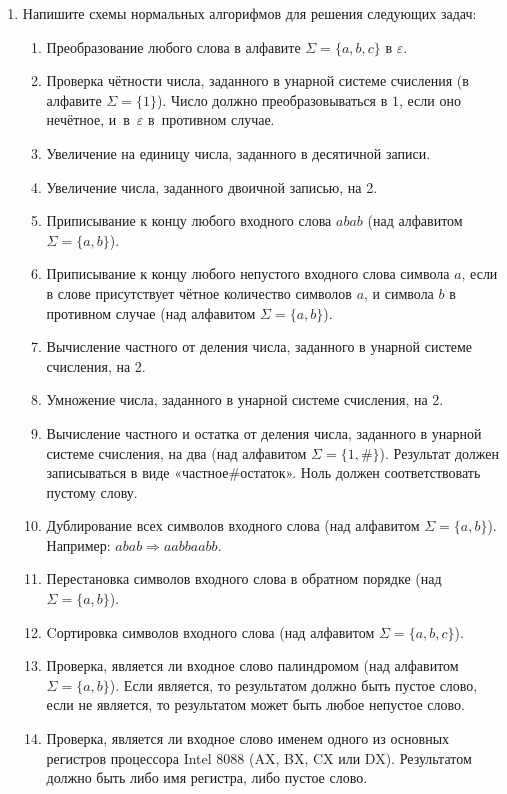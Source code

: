 \documentclass[12pt,a4paper]{article}
\newcommand{\alphabet}[2]{#1=\{#2\}}
\newcommand{\salp}[1]{\alphabet{\Sigma}{#1}}
\begin{document}
\begin{enumerate}
\item Напишите схемы нормальных алгорифмов для решения следующих задач:
\begin{enumerate}[topsep=0pt,partopsep=0pt,itemsep=1pt]
\item Преобразование любого слова в алфавите $\salp{a,b,c}$ в $\varepsilon$.

\item Проверка чётности числа, заданного в унарной системе счисления (в алфавите $\salp{1}$).
Число должно преобразовываться в $1$, если оно нечётное, и~в~$\varepsilon$ в~противном случае.

\item Увеличение на единицу числа, заданного в десятичной записи.

\item Увеличение числа, заданного двоичной записью, на 2.

\item Приписывание к концу любого входного слова $abab$ (над алфавитом $\salp{a,b}$).

\item Приписывание к концу любого непустого входного слова символа $a$, если в слове
 присутствует чётное количество символов $a$, и символа $b$ в противном случае (над алфавитом $\salp{a,b}$).

\item Вычисление частного от деления числа, заданного в унарной системе счисления, на 2.

\item Умножение числа, заданного в унарной системе счисления, на 2.

\item Вычисление частного и остатка от деления числа, заданного в унарной системе счисления, на 
два (над алфавитом $\salp{1,\#}$). Результат должен записываться в виде «частное$\#$остаток». 
Ноль должен соответствовать пустому слову.

\item Дублирование всех символов входного слова (над алфавитом $\salp{a,b}$). 
Например: $abab\Rightarrow aabbaabb$.

\item Перестановка символов входного слова в обратном порядке (над $\salp{a,b}$).

\item Cортировка символов входного слова (над алфавитом $\salp{a,b,c}$).

\item Проверка, является ли входное слово палиндромом (над алфавитом $\salp{a,b}$). 
Если является, то результатом должно быть пустое слово,
если не является, то результатом может быть любое непустое слово.

\item Проверка, является ли входное слово именем одного из основных регистров процессора Intel 8088
(AX, BX, CX или DX).  Результатом должно быть либо имя регистра, либо пустое слово.
\end{enumerate}

\end{enumerate}
\end{document}
